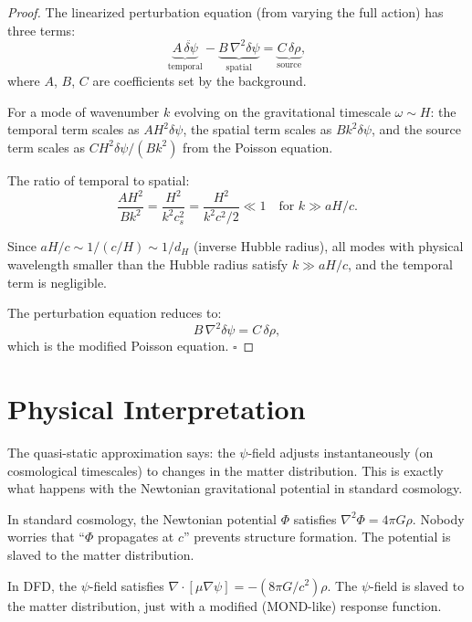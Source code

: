 \documentclass[11pt]{article}
\begin{document}
\begin{proof}
The linearized perturbation equation (from varying the full action)
has three terms:
\begin{equation}
\underbrace{A\,\ddot{\delta\psi}}_{\text{temporal}}
- \underbrace{B\,\nabla^2\delta\psi}_{\text{spatial}}
= \underbrace{C\,\delta\rho}_{\text{source}},
\end{equation}
where $A$, $B$, $C$ are coefficients set by the background.

For a mode of wavenumber $k$ evolving on the gravitational timescale
$\omega \sim H$: the temporal term scales as $A H^2 \delta\psi$, the
spatial term scales as $B k^2 \delta\psi$, and the source term scales
as $C H^2 \delta\psi / (Bk^2)$ from the Poisson equation.

The ratio of temporal to spatial:
\begin{equation}
\frac{A H^2}{B k^2} = \frac{H^2}{k^2 c_s^2}
= \frac{H^2}{k^2 c^2/2} \ll 1 \quad\text{for } k \gg aH/c.
\end{equation}

Since $aH/c \sim 1/(c/H) \sim 1/d_H$ (inverse Hubble radius),
all modes with physical wavelength smaller than the Hubble radius
satisfy $k \gg aH/c$, and the temporal term is negligible.

The perturbation equation reduces to:
\begin{equation}
B\,\nabla^2\delta\psi = C\,\delta\rho,
\end{equation}
which is the modified Poisson equation. $\square$
\end{proof}

\section{Physical Interpretation}

The quasi-static approximation says: the $\psi$-field adjusts
instantaneously (on cosmological timescales) to changes in the matter
distribution. This is exactly what happens with the Newtonian
gravitational potential in standard cosmology.

In standard cosmology, the Newtonian potential $\Phi$ satisfies
$\nabla^2\Phi = 4\pi G\rho$. Nobody worries that ``$\Phi$ propagates
at $c$'' prevents structure formation. The potential is slaved to the
matter distribution.

In DFD, the $\psi$-field satisfies $\nabla\cdot[\mu\nabla\psi] =
-(8\pi G/c^2)\rho$. The $\psi$-field is slaved to the matter
distribution, just with a modified (MOND-like) response function.
\end{document}
